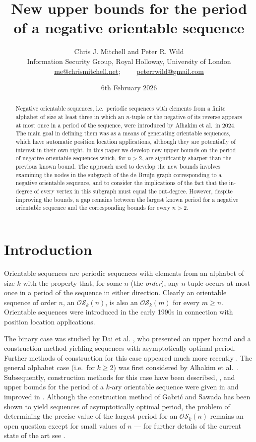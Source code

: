 \documentclass[a4paper,11pt]{article}
\title{New upper bounds for the period of a negative orientable sequence}
\author{Chris J. Mitchell and Peter R. Wild
\\Information Security Group, Royal Holloway, University of London\\
\href{mailto:me@chrismitchell.net}{me@chrismitchell.net};
~~~~\href{mailto:peterrwild@gmail.com}{peterrwild@gmail.com}}
\date{6th February 2026}
\theoremstyle{plain}
\theoremstyle{definition}
\theoremstyle{remark}
\begin{document}
\maketitle



\begin{abstract}
Negative orientable sequences, i.e.\ periodic sequences with elements from a finite alphabet of
size at least three in which an $n$-tuple or the negative of its reverse appears at most once
in a period of the sequence, were introduced by Alhakim et al.\ in 2024. The main goal in
defining them was as a means of generating orientable sequences, which have automatic position
location applications, although they are potentially of interest in their own right.  In this
paper we develop new upper bounds on the period of negative orientable sequences which, for
$n>2$, are significantly sharper than the previous known bound.  The approach used to develop
the new bounds involves examining the nodes in the subgraph of the de Bruijn graph
corresponding to a negative orientable sequence, and to consider the implications of the fact
that the in-degree of every vertex in this subgraph must equal the out-degree. However, despite
improving the bounds, a gap remains between the largest known period for a negative orientable
sequence and the corresponding bounds for every $n>2$.
\end{abstract}

\section{Introduction}

Orientable sequences are periodic sequences with elements from an alphabet of size $k$ with the
property that, for some $n$ (the \emph{order}), any $n$-tuple occurs at most once in a period of
the sequence in either direction.  Clearly an orientable sequence of order $n$, an
$\mathcal{OS}_k(n)$, is also an $\mathcal{OS}_k(m)$ for every $m\geq n$. Orientable sequences were
introduced in the early 1990s \cite{Burns92,Burns93} in connection with position location
applications.

The binary case was studied by Dai et al. \cite{Dai93}, who presented an upper bound and a
construction method yielding sequences with asymptotically optimal period.  Further methods of
construction for this case appeared much more recently \cite{Gabric24,Gabric24b,Mitchell22}. The
general alphabet case (i.e.\ for $k\geq2$) was first considered by Alhakim et al.\
\cite{Alhakim24a}. Subsequently, construction methods for this case have been described,
\cite{Gabric25,Mitchell25,Mitchell25a}, and upper bounds for the period of a $k$-ary orientable
sequence were given in \cite{Mitchell25a} and improved in \cite{Mitchell25}.  Although the
construction method of Gabri\'{c} and Sawada \cite{Gabric25} has been shown to yield sequences of
asymptotically optimal period, the problem of determining the precise value of the largest period
for an $\mathcal{OS}_k(n)$ remains an open question except for small values of $n$ --- for further
details of the current state of the art see \cite{Mitchell25}.
\end{document}
